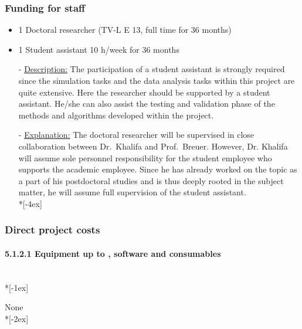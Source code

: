 \documentclass[11pt,a4paper,twoside]{scrartcl}
\begin{document}
\subsubsection{Funding for staff}
\begin{itemize}
	\item 1 Doctoral researcher (TV-L E 13, full time for 36 
	months)\vspace{0.2cm} 
	
	\item 1 Student assistant 10 h/week for 36 months
	
	  - \underline{Description:}
          The participation of a student assistant is strongly
	required since the simulation tasks and the data analysis tasks within
	this project are quite extensive. Here the researcher
	should be supported by a student assistant. He/she can also assist the
	testing and validation phase of the methods and algorithms developed
	within the project.

        - \underline{Explanation:} The doctoral researcher will be
        supervised in close collaboration between Dr.\ Khalifa and
        Prof.\ Breuer.  However, Dr. Khalifa will assume sole
        personnel responsibility for the student employee who supports
        the academic employee. Since he has already worked on the topic
        as a part of his postdoctoral studies and is thus deeply rooted in
        the subject matter, he will assume full supervision of the
        student assistant.\\*[-4ex]
\end{itemize}




\subsubsection{Direct project costs}

\paragraph{5.1.2.1 Equipment up to , software and 
consumables}~\\*[-1ex]

\qquad \quad None\\*[-2ex]
\end{document}
